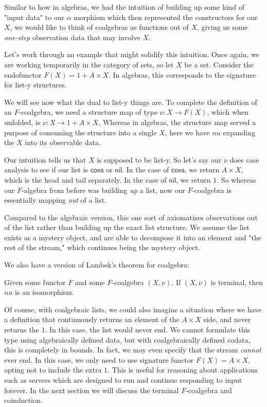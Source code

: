 Similar to how in algebras, we had the intuition of building up some kind of "input data" to our $\alpha$ morphism which then represented the constructors for our $X$, we would like to think of coalgebras as functions out of $X$, giving us some \emph{one-step} observation data that may involve $X$.

Let's work through an example that might solidify this intuition.
Once again, we are working temporarily in the category of sets, so let $X$ be a set.
Consider the endofunctor $F(X) = 1 + A \times X$.
In algebras, this corresponds to the signature for list-y structures.

We will see now what the dual to list-y things are.
To complete the definition of an $F$-coalgebra, we need a structure map of type $\nu : X \rightarrow F(X)$, which when unfolded, is $\nu : X \rightarrow 1 + A \times X$.
Whereas in algebras, the structure map served a purpose of consuming the structure into a single $X$, here we have $nu$ expanding the $X$ into its observable data.

Our intuition tells us that $X$ is supposed to be list-y.
So let's say our $\nu$ does case analysis to see if our list is $\mathsf{cons}$ or $\mathsf{nil}$.
In the case of $\mathsf{cons}$, we return $A \times X$, which is the head and tail separately.
In the case of $\mathsf{nil}$, we return $1$.
So whereas our $F$-algebra from before was building \emph{up} a list, now our $F$-coalgebra is essentially mapping \emph{out} of a list.

Compared to the algebraic version, this one sort of axiomatizes observations out of the list rather than building up the exact list structure.
We assume the list exists as a mystery object, and are able to decompose it into an element and "the rest of the stream," which continues being the mystery object.

We also have a version of Lambek's theorem for coalgebra:

\begin{theorem}
    \label{thm:lambekCoalgebra}
  Given some functor $F$ and some $F$-coalgebra $(X, \nu)$. If $(X, \nu)$ is terminal, then $nu$ is an isomorphism.
\end{theorem}


Of course, with coalgebraic lists, we could also imagine a situation where we have a definition that continuously returns an element of the $A \times X$ side, and never returns the $1$.
In this case, the list would never end.
We cannot formulate this type using algebraically defined data, but with coalgebraically defined codata, this is completely in bounds.
In fact, we may even specify that the stream \emph{cannot} ever end.
In this case, we only need to use signature functor $F(X) = A \times X$, opting not to include the extra $1$.
This is useful for reasoning about applications such as servers which are designed to run and continue responding to input forever.
In the next section we will discuss the terminal $F$-coalgebra and coinduction.

